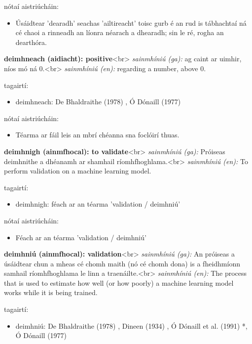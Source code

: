\documentclass{article}
\begin{document}
nótaí aistriúcháin:
\begin{itemize}
	\item Úsáidtear 'dearadh' seachas 'ailtireacht' toisc gurb é an rud is tábhachtaí ná cé chaoi a rinneadh an líonra néarach a dhearadh; sin le ré, rogha an dearthóra.
\end{itemize}


\textbf{deimhneach (aidiacht): positive}<br>
\textit{sainmhíniú (ga):} ag caint ar uimhir, níos mó ná 0.<br>
\textit{sainmhíniú (en):} regarding a number, above 0.

tagairtí:
\begin{itemize}
	\item deimhneach: De Bhaldraithe (1978) \cite{de-bhaldraithe}, Ó Dónaill (1977) \cite{odonaill}
\end{itemize}

nótaí aistriúcháin:
\begin{itemize}
	\item Téarma ar fáil leis an mbrí chéanna sna foclóirí thuas.
\end{itemize}


\textbf{deimhnigh (ainmfhocal): to validate}<br>
\textit{sainmhíniú (ga):} Próiseas deimhnithe a dhéanamh ar shamhail ríomhfhoghlama.<br>
\textit{sainmhíniú (en):} To perform validation on a machine learning model.

tagairtí:
\begin{itemize}
	\item deimhnigh: féach ar an téarma 'validation / deimhniú'
\end{itemize}

nótaí aistriúcháin:
\begin{itemize}
	\item Féach ar an téarma 'validation / deimhniú'
\end{itemize}


\textbf{deimhniú (ainmfhocal): validation}<br>
\textit{sainmhíniú (ga):} An próiseas a úsáidtear chun a mheas cé chomh maith (nó cé chomh dona) is a fheidhmíonn samhail ríomhfhoghlama le linn a traenáilte.<br>
\textit{sainmhíniú (en):} The process that is used to estimate how well (or how poorly) a machine learning model works while it is being trained.

tagairtí:
\begin{itemize}
	\item deimhniú: De Bhaldraithe (1978) \cite{de-bhaldraithe}, Dineen (1934) \cite{dineen}, Ó Dónaill et al. (1991) \cite{focloir-beag}*, Ó Dónaill (1977) \cite{odonaill}
\end{itemize}
\end{document}
